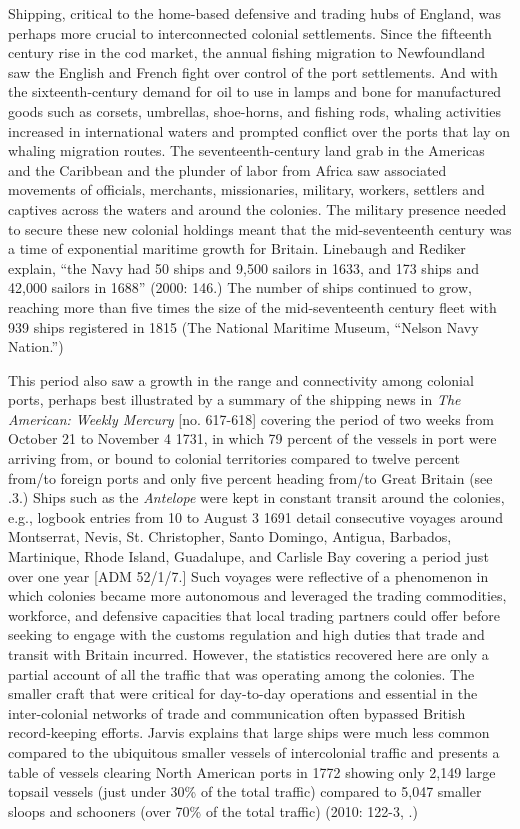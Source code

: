 Shipping, critical to the home-based defensive and trading hubs of England, was perhaps more crucial to interconnected colonial settlements. Since the fifteenth century rise in the cod market, the annual fishing migration to Newfoundland saw the English and French fight over control of the port settlements. And with the sixteenth-century demand for oil to use in lamps and bone for manufactured goods such as corsets, umbrellas, shoe-horns, and fishing rods, whaling activities increased in international waters and prompted conflict over the ports that lay on whaling migration routes. The seventeenth-century land grab in the Americas and the Caribbean and the plunder of labor from Africa saw associated movements of officials, merchants, missionaries, military, workers, settlers and captives across the waters and around the colonies. The military presence needed to secure these new colonial holdings meant that the mid-seventeenth century was a time of exponential maritime growth for Britain. Linebaugh and Rediker explain, “the Navy had 50 ships and 9,500 sailors in 1633, and 173 ships and 42,000 sailors in 1688” (2000: 146.)  The number of ships continued to grow, reaching more than five times the size of the mid-seventeenth century fleet with 939 ships registered in 1815 (The National Maritime Museum, “Nelson Navy Nation.”) 

This period also saw a growth in the range and connectivity among colonial ports, perhaps best illustrated by a summary of the shipping news in \textit{The American: Weekly Mercury} [no. 617-618] covering the period of two weeks from October 21 to November 4 1731, in which 79 percent of the vessels in port were arriving from, or bound to colonial territories compared to twelve percent from/to foreign ports and only five percent heading from/to Great Britain (see .3.) Ships such as the \textit{Antelope} were kept in constant transit around the colonies, e.g., logbook entries from 10 \citealt{June1690} to August 3 1691 detail consecutive voyages around Montserrat, Nevis, St. Christopher, Santo Domingo, Antigua, Barbados, Martinique, Rhode Island, Guadalupe, and Carlisle Bay covering a period just over one year [ADM 52/1/7.] Such voyages were reflective of a phenomenon in which colonies became more autonomous and leveraged the trading commodities, workforce, and defensive capacities that local trading partners could offer before seeking to engage with the customs regulation and high duties that trade and transit with Britain incurred. However, the statistics recovered here are only a partial account of all the traffic that was operating among the colonies. The smaller craft that were critical for day-to-day operations and essential in the inter-colonial networks of trade and communication often bypassed British record-keeping efforts. Jarvis explains that large ships were much less common compared to the ubiquitous smaller vessels of intercolonial traffic and presents a table of vessels clearing North American ports in 1772 showing only 2,149 large topsail vessels (just under 30\% of the total traffic) compared to 5,047 smaller sloops and schooners (over 70\% of the total traffic) (2010: 122-3, .) 


